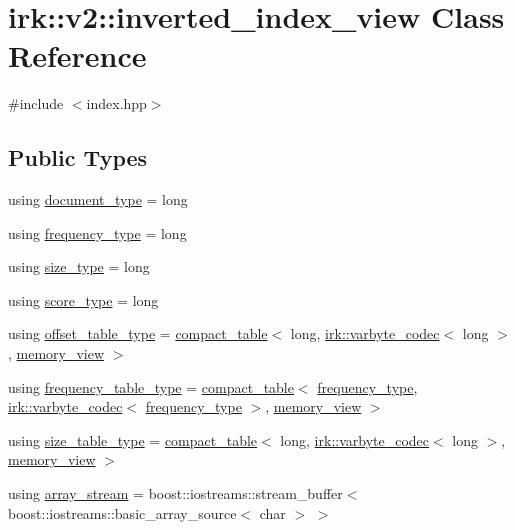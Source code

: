 \hypertarget{classirk_1_1v2_1_1inverted__index__view}{}\section{irk\+:\+:v2\+:\+:inverted\+\_\+index\+\_\+view Class Reference}
\label{classirk_1_1v2_1_1inverted__index__view}


{\ttfamily \#include $<$index.\+hpp$>$}

\subsection*{Public Types}
\begin{DoxyCompactItemize}
\item 
using \mbox{\hyperlink{classirk_1_1v2_1_1inverted__index__view_a8441dcf60be934782fdaa9411723700b}{document\+\_\+type}} = long
\item 
using \mbox{\hyperlink{classirk_1_1v2_1_1inverted__index__view_ab52405d4c17e6e82893d2650a56e0a32}{frequency\+\_\+type}} = long
\item 
using \mbox{\hyperlink{classirk_1_1v2_1_1inverted__index__view_aebba8b75ebd7b14d546a29fe925352d6}{size\+\_\+type}} = long
\item 
using \mbox{\hyperlink{classirk_1_1v2_1_1inverted__index__view_a5a1f88560e9fe17b54c7af6e2aa31639}{score\+\_\+type}} = long
\item 
using \mbox{\hyperlink{classirk_1_1v2_1_1inverted__index__view_a360d892dce2f7f984ae98119e6b6eb3e}{offset\+\_\+table\+\_\+type}} = \mbox{\hyperlink{classirk_1_1compact__table}{compact\+\_\+table}}$<$ long, \mbox{\hyperlink{structirk_1_1varbyte__codec}{irk\+::varbyte\+\_\+codec}}$<$ long $>$, \mbox{\hyperlink{classirk_1_1memory__view}{memory\+\_\+view}} $>$
\item 
using \mbox{\hyperlink{classirk_1_1v2_1_1inverted__index__view_ab247a56cfb430693e05ee2ff1d10221e}{frequency\+\_\+table\+\_\+type}} = \mbox{\hyperlink{classirk_1_1compact__table}{compact\+\_\+table}}$<$ \mbox{\hyperlink{classirk_1_1v2_1_1inverted__index__view_ab52405d4c17e6e82893d2650a56e0a32}{frequency\+\_\+type}}, \mbox{\hyperlink{structirk_1_1varbyte__codec}{irk\+::varbyte\+\_\+codec}}$<$ \mbox{\hyperlink{classirk_1_1v2_1_1inverted__index__view_ab52405d4c17e6e82893d2650a56e0a32}{frequency\+\_\+type}} $>$, \mbox{\hyperlink{classirk_1_1memory__view}{memory\+\_\+view}} $>$
\item 
using \mbox{\hyperlink{classirk_1_1v2_1_1inverted__index__view_a4f939f733921ca3f5946288273b427d7}{size\+\_\+table\+\_\+type}} = \mbox{\hyperlink{classirk_1_1compact__table}{compact\+\_\+table}}$<$ long, \mbox{\hyperlink{structirk_1_1varbyte__codec}{irk\+::varbyte\+\_\+codec}}$<$ long $>$, \mbox{\hyperlink{classirk_1_1memory__view}{memory\+\_\+view}} $>$
\item 
using \mbox{\hyperlink{classirk_1_1v2_1_1inverted__index__view_a0dd0327febf8c41ecfd339374c47ce5f}{array\+\_\+stream}} = boost\+::iostreams\+::stream\+\_\+buffer$<$ boost\+::iostreams\+::basic\+\_\+array\+\_\+source$<$ char $>$ $>$
\end{DoxyCompactItemize}
